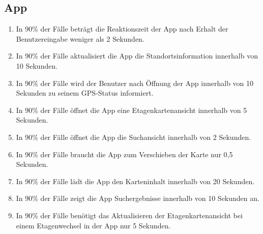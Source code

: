 \subsection*{App}

\begin{samepage}
    \begin{enumerate}[label=\textbf{/NFL\arabic*0/}, align=left]
        \item In 90\% der Fälle beträgt die \Gls{Reaktionszeit} der App nach Erhalt der \Gls{Benutzereingabe} weniger als 2 Sekunden.
        \item In 90\% der Fälle aktualisiert die App die Standortsinformation innerhalb von 10 Sekunden.
        \item In 90\% der Fälle wird der \Gls{Benutzer} nach Öffnung der App innerhalb von 10 Sekunden zu seinem \Gls{GPS}-Status informiert.
        \item In 90\% der Fälle öffnet die App eine \Gls{Etagenkartenansicht} innerhalb von 5 Sekunden.
        \item In 90\% der Fälle öffnet die App die \Gls{Suchansicht} innerhalb von 2 Sekunden.
        \item In 90\% der Fälle braucht die App zum Verschieben der \Gls{Karte} nur 0,5 Sekunden.
        \item In 90\% der Fälle lädt die App den Karteninhalt innerhalb von 20 Sekunden.
        \item In 90\% der Fälle zeigt die App Suchergebnisse innerhalb von 10 Sekunden an.
        \item In 90\% der Fälle benötigt das Aktualisieren der \Gls{Etagenkartenansicht} bei einem \Gls{Etagenwechsel} in der App nur 5 Sekunden.
    \end{enumerate}
\end{samepage}